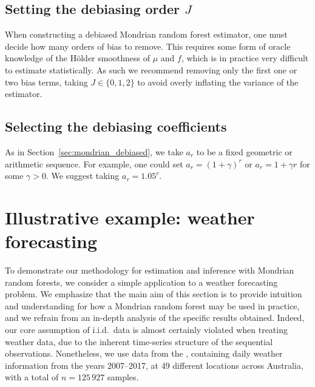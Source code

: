 \subsection{Setting the debiasing order \texorpdfstring{$J$}{J}}%

When constructing a debiased Mondrian random forest estimator, one must decide
how many orders of bias to remove. This requires some form of
oracle knowledge of the H{\"o}lder smoothness of $\mu$ and $f$, which is in
practice very difficult to estimate statistically. As such we recommend
removing only the first one or two bias terms, taking $J \in \{0,1,2\}$ to
avoid overly inflating the variance of the estimator.

\subsection{Selecting the debiasing coefficients}%

As in Section~\ref{sec:mondrian_debiased}, we take $a_r$ to be a fixed
geometric or arithmetic sequence. For example, one could set
$a_r = (1+\gamma)^r$ or $a_r = 1 + \gamma r$ for some $\gamma > 0$.
We suggest taking $a_r = 1.05^r$.

\section{Illustrative example: weather forecasting}%
\label{sec:mondrian_weather}

To demonstrate our methodology for estimation and inference with Mondrian random
forests, we consider a simple application
to a weather forecasting problem. We emphasize that the main aim of this
section is to provide intuition and understanding for how a Mondrian random
forest may be used in practice, and we refrain from an in-depth analysis of the
specific results obtained. Indeed, our core assumption of i.i.d.\ data is almost
certainly
violated when treating weather data, due to the inherent time-series structure
of the sequential observations.
Nonetheless, we use data from the \cite{bureau2017daily}, containing daily
weather
information from the years 2007--2017, at 49 different
locations across Australia, with a total of $n = 125\,927$ samples.


